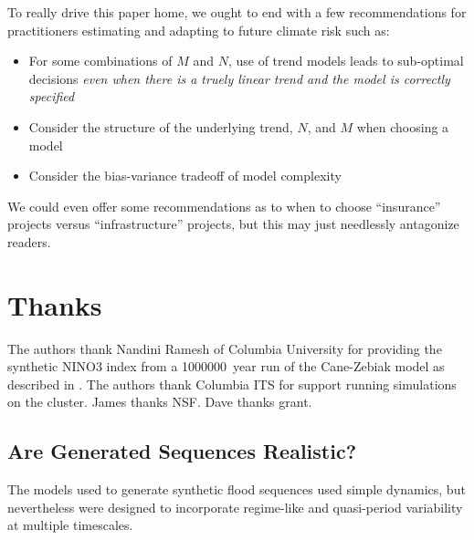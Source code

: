 \documentclass[12pt]{article}
\begin{document}
To really drive this paper home, we ought to end with a few recommendations for practitioners estimating and adapting to future climate risk such as:
\begin{itemize}
  \item For some combinations of $M$ and $N$, use of trend models leads to sub-optimal decisions \emph{even when there is a truely linear trend and the model is correctly specified}
  \item Consider the structure of the underlying trend, $N$, and $M$ when choosing a model
  \item Consider the bias-variance tradeoff of model complexity
\end{itemize}
We could even offer some recommendations as to when to choose ``insurance'' projects versus ``infrastructure'' projects, but this may just needlessly antagonize readers.


\appendix

\section{Thanks}

The authors thank Nandini Ramesh of Columbia University for providing the synthetic NINO3 index from a \SI{1000000}{year} run of the Cane-Zebiak model as described in \citet{Ramesh2017}.
The authors thank Columbia ITS for support running simulations on the cluster.
James thanks NSF.
Dave thanks grant.

\subsection{Are Generated Sequences Realistic?\label{sec:sequence-realistic}}

The models used to generate synthetic flood sequences used simple dynamics, but nevertheless were designed to incorporate regime-like and quasi-period variability at multiple timescales.
\end{document}
